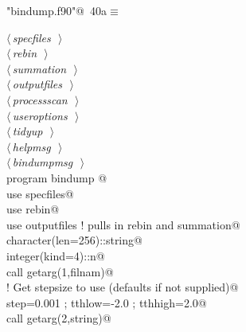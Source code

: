 \documentclass[10pt,a4paper,notitlepage]{article}
\begin{document}
\begin{flushleft} \small
\begin{minipage}{\linewidth}\label{scrap43}\raggedright\small
{} \verb@"bindump.f90"@\nobreak\ {\footnotesize {40a}}$\equiv$
\vspace{-1ex}
\begin{list}{}{} \item
\mbox{}\verb@@\hbox{$\langle\,${\it specfiles}\nobreak\ {\footnotesize {}}$\,\rangle$}\verb@@\\
\mbox{}\verb@@\hbox{$\langle\,${\it rebin}\nobreak\ {\footnotesize {}}$\,\rangle$}\verb@@\\
\mbox{}\verb@@\hbox{$\langle\,${\it summation}\nobreak\ {\footnotesize {}}$\,\rangle$}\verb@@\\
\mbox{}\verb@@\hbox{$\langle\,${\it outputfiles}\nobreak\ {\footnotesize {}}$\,\rangle$}\verb@@\\
\mbox{}\verb@@\hbox{$\langle\,${\it processscan}\nobreak\ {\footnotesize {}}$\,\rangle$}\verb@@\\
\mbox{}\verb@@\hbox{$\langle\,${\it useroptions}\nobreak\ {\footnotesize {}}$\,\rangle$}\verb@@\\
\mbox{}\verb@@\hbox{$\langle\,${\it tidyup}\nobreak\ {\footnotesize {}}$\,\rangle$}\verb@@\\
\mbox{}\verb@@\hbox{$\langle\,${\it helpmsg}\nobreak\ {\footnotesize {}}$\,\rangle$}\verb@@\\
\mbox{}\verb@@\hbox{$\langle\,${\it bindumpmsg}\nobreak\ {\footnotesize {}}$\,\rangle$}\verb@@\\
\mbox{}\verb@      program bindump @\\
\mbox{}\verb@      use specfiles@\\
\mbox{}\verb@      use rebin@\\
\mbox{}\verb@      use outputfiles ! pulls in rebin and summation@\\
\mbox{}\verb@      character(len=256)::string@\\
\mbox{}\verb@      integer(kind=4)::n@\\
\mbox{}\verb@      call getarg(1,filnam)@\\
\mbox{}\verb@! Get stepsize to use (defaults if not supplied)@\\
\mbox{}\verb@      step=0.001 ; tthlow=-2.0 ; tthhigh=2.0@\\
\mbox{}\verb@      call getarg(2,string)@\\

\end{list}
\end{minipage}
\end{flushleft}
\end{document}
